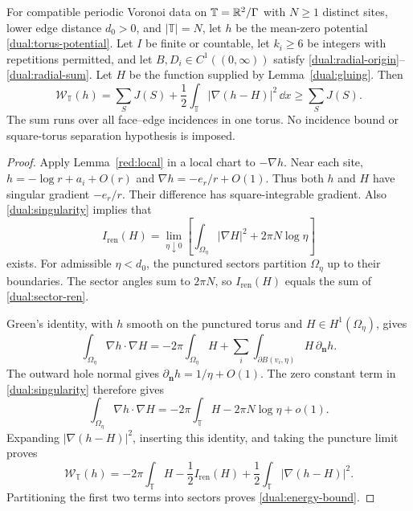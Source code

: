 \begin{proposition}
\label{dual:identity}
For compatible periodic Voronoi data on
\(\mathbb T=\mathbb R^2/\Gamma\) with \(N\geq1\) distinct sites, lower edge
distance \(d_0>0\), and \(|\mathbb T|=N\), let \(h\) be the mean-zero
potential \eqref{dual:torus-potential}. Let \(I\) be finite or countable,
let \(k_i\geq6\) be integers with repetitions permitted, and let
\(B,D_i\in C^1((0,\infty))\) satisfy
\eqref{dual:radial-origin}--\eqref{dual:radial-sum}. Let \(H\) be the
function supplied by Lemma~\ref{dual:gluing}. Then
\begin{equation}
 \mathcal W_{\mathbb T}(h)
   =\sum_S J(S)+
              \frac12\int_{\mathbb T}|\nabla(h-H)|^2\,\dd x
   \geq\sum_S J(S).
 \label{dual:energy-bound}
\end{equation}
The sum runs over all face--edge incidences in one torus.
No incidence bound or square-torus separation hypothesis is imposed.
\end{proposition}

\begin{proof}
Apply Lemma~\ref{red:local} in a local chart to \(-\nabla h\).
Near each site, \(h=-\log r+a_i+O(r)\) and
\(\nabla h=-e_r/r+O(1)\). Thus both \(h\) and \(H\) have singular
gradient \(-e_r/r\).
Their difference has square-integrable gradient.  Also
\eqref{dual:singularity} implies that
\[
 I_{\mathrm{ren}}(H)=
 \lim_{\eta\downarrow0}\left[
       \int_{\Omega_\eta}|\nabla H|^2+2\pi N\log\eta\right]
\]
exists. For admissible \(\eta<d_0\), the punctured sectors partition
\(\Omega_\eta\) up to their boundaries. The sector angles sum to
\(2\pi N\), so \(I_{\mathrm{ren}}(H)\) equals the sum of
\eqref{dual:sector-ren}.

Green's identity, with \(h\) smooth on the punctured torus and
\(H\in H^1(\Omega_\eta)\), gives
\[
 \int_{\Omega_\eta}\nabla h\cdot\nabla H
  =-2\pi\int_{\Omega_\eta}H
     +\sum_i\int_{\partial B(v_i,\eta)}
                          H\,\partial_{\boldsymbol n}h.
\]
The outward hole normal gives
\(\partial_{\boldsymbol n}h=1/\eta+O(1)\).
The zero constant term in \eqref{dual:singularity} therefore
gives
\[
 \int_{\Omega_\eta}\nabla h\cdot\nabla H
      =-2\pi\int_{\mathbb T}H-2\pi N\log\eta+o(1).
\]
Expanding \(|\nabla(h-H)|^2\), inserting this identity, and
taking the puncture limit proves
\[
 \mathcal W_{\mathbb T}(h)
   =-2\pi\int_{\mathbb T}H-\frac12I_{\mathrm{ren}}(H)
          +\frac12\int_{\mathbb T}|\nabla(h-H)|^2.
\]
Partitioning the first two terms into sectors proves
\eqref{dual:energy-bound}.
\end{proof}

